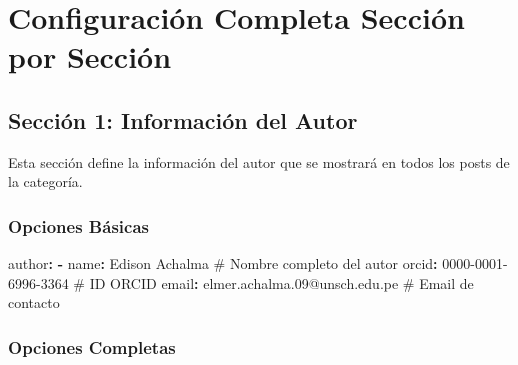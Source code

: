 \documentclass[
  doc,
  floatsintext,
  longtable,
  a4paper,
  nolmodern,
  notxfonts,
  notimes,
  12pt,
  colorlinks=true,linkcolor=blue,citecolor=blue,urlcolor=blue]{apa7}
\newenvironment{Shaded}{\begin{snugshade}}{\end{snugshade}}
\newcommand{\AttributeTok}[1]{\textcolor[rgb]{0.40,0.45,0.13}{#1}}
\newcommand{\CommentTok}[1]{\textcolor[rgb]{0.37,0.37,0.37}{#1}}
\newcommand{\FunctionTok}[1]{\textcolor[rgb]{0.28,0.35,0.67}{#1}}
\newcommand{\KeywordTok}[1]{\textcolor[rgb]{0.00,0.23,0.31}{\textbf{#1}}}
\begin{document}
\section{Configuración Completa Sección por
Sección}\label{configuraciuxf3n-completa-secciuxf3n-por-secciuxf3n}

\subsection{Sección 1: Información del
Autor}\label{secciuxf3n-1-informaciuxf3n-del-autor}

Esta sección define la información del autor que se mostrará en todos
los posts de la categoría.

\subsubsection{Opciones Básicas}\label{opciones-buxe1sicas}

\begin{Shaded}
\begin{Highlighting}[]
\FunctionTok{author}\KeywordTok{:}
\AttributeTok{  }\KeywordTok{{-}}\AttributeTok{ }\FunctionTok{name}\KeywordTok{:}\AttributeTok{ Edison Achalma}\CommentTok{                     \# Nombre completo del autor}
\AttributeTok{    }\FunctionTok{orcid}\KeywordTok{:}\AttributeTok{ 0000{-}0001{-}6996{-}3364}\CommentTok{               \# ID ORCID}
\AttributeTok{    }\FunctionTok{email}\KeywordTok{:}\AttributeTok{ elmer.achalma.09@unsch.edu.pe}\CommentTok{     \# Email de contacto}
\end{Highlighting}
\end{Shaded}

\subsubsection{Opciones Completas}\label{opciones-completas}
\end{document}
